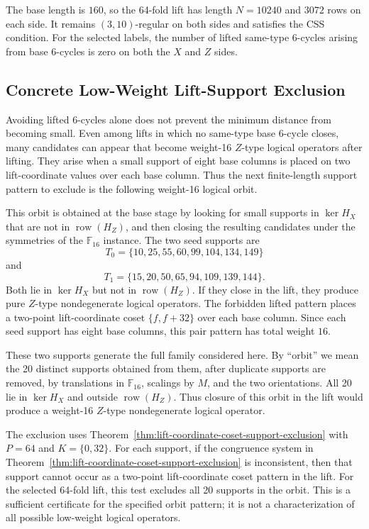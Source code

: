 \documentclass[11pt,a4paper]{article}
\newcommand{\F}{\mathbb{F}}
\newcommand{\HX}{H_X}
\newcommand{\HZ}{H_Z}
\newcommand{\row}{\operatorname{row}}
\theoremstyle{uprighttheorem}
\begin{document}
The base length is \(160\), so the 64-fold lift has length \(N=10240\) and \(3072\) rows on each side.
It remains \((3,10)\)-regular on both sides and satisfies the CSS condition.
For the selected labels, the number of lifted same-type 6-cycles arising from base 6-cycles is zero on both the \(X\) and \(Z\) sides.

\subsection{Concrete Low-Weight Lift-Support Exclusion}
Avoiding lifted 6-cycles alone does not prevent the minimum distance from becoming small.
Even among lifts in which no same-type base 6-cycle closes, many candidates can appear that become weight-16 \(Z\)-type logical operators after lifting.
They arise when a small support of eight base columns is placed on two lift-coordinate values over each base column.
Thus the next finite-length support pattern to exclude is the following weight-16 logical orbit.

This orbit is obtained at the base stage by looking for small supports in \(\ker\HX\) that are not in \(\row(\HZ)\), and then closing the resulting candidates under the symmetries of the \(\F_{16}\) instance.
The two seed supports are
\[
  T_0=\{10,25,55,60,99,104,134,149\}
\]
and
\[
  T_1=\{15,20,50,65,94,109,139,144\}.
\]
Both lie in $\ker\HX$ but not in $\row(\HZ)$.
If they close in the lift, they produce pure $Z$-type nondegenerate logical operators.
The forbidden lifted pattern places a two-point lift-coordinate coset \(\{f,f+32\}\) over each base column.
Since each seed support has eight base columns, this pair pattern has total weight \(16\).

These two supports generate the full family considered here.
By ``orbit'' we mean the 20 distinct supports obtained from them, after duplicate supports are removed, by translations in $\F_{16}$, scalings by $M$, and the two orientations.
All 20 lie in $\ker\HX$ and outside $\row(\HZ)$.
Thus closure of this orbit in the lift would produce a weight-16 $Z$-type nondegenerate logical operator.

The exclusion uses Theorem~\ref{thm:lift-coordinate-coset-support-exclusion} with \(P=64\) and \(K=\{0,32\}\).
For each support, if the congruence system in Theorem~\ref{thm:lift-coordinate-coset-support-exclusion} is inconsistent, then that support cannot occur as a two-point lift-coordinate coset pattern in the lift.
For the selected 64-fold lift, this test excludes all 20 supports in the orbit.
This is a sufficient certificate for the specified orbit pattern; it is not a characterization of all possible low-weight logical operators.
\end{document}
